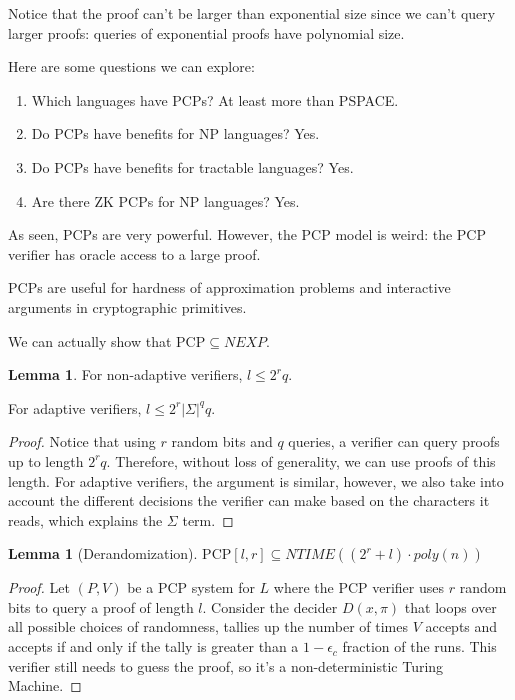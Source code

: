 \documentclass{article}
\theoremstyle{definition}
\newtheorem{lemma}[theorem]{Lemma}
\newcommand{\pcp}{\text{PCP}}
\begin{document}
Notice that the proof can't be larger than exponential size since we can't query
larger proofs: queries of exponential proofs have polynomial size.

Here are some questions we can explore:

\begin{enumerate}
    \item Which languages have PCPs? At least more than PSPACE.
    \item Do PCPs have benefits for NP languages? Yes.
    \item Do PCPs have benefits for tractable languages? Yes.
    \item Are there ZK PCPs for NP languages? Yes.
\end{enumerate}

As seen, PCPs are very powerful. However, the PCP model is weird:
the PCP verifier has oracle access to a large proof. 

PCPs are useful for hardness of approximation problems and interactive
arguments in cryptographic primitives.

We can actually show that $\pcp \subseteq NEXP$.

\begin{lemma}
    For non-adaptive verifiers, $l \leq 2^{r}q$.
    
    For adaptive verifiers, $l \leq 2^{r}\lvert \Sigma \rvert^{q}q$.
\end{lemma}
\begin{proof}
    Notice that using $r$ random bits and $q$ queries, a verifier can query proofs
    up to length $2^{r}q$. Therefore, without loss of generality, we can use proofs
    of this length. For adaptive verifiers, the argument is similar, however, we
    also take into account the different decisions the verifier can make based on
    the characters it reads, which explains the $\Sigma$ term.
\end{proof}

\begin{lemma}[Derandomization]
    $\pcp[l,r] \subseteq NTIME((2^{r} + l) \cdot poly(n))$
\end{lemma}
\begin{proof}
    Let $(P,V)$ be a $\pcp$ system for $L$ where the PCP verifier
    uses $r$ random bits to query a proof of length $l$. Consider the
    decider $D(x,\pi)$ that loops over all possible choices of randomness,
    tallies up the number of times $V$ accepts and accepts if and only if 
    the tally is greater than a $1 - \epsilon_{c}$ fraction of the runs.
    This verifier still needs to guess the proof, so it's a non-deterministic
    Turing Machine.
\end{proof}
\end{document}
